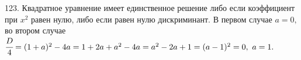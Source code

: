 123. Квадратное уравнение имеет единственное решение либо если коэффициент при $x^2$ равен нулю, либо если равен нулю дискриминант. В первом случае $a=0,$ во втором случае $\cfrac{D}{4}=(1+a)^2-4a=1+2a+a^2-4a=a^2-2a+1=(a-1)^2=0,\ a=1.$\\
